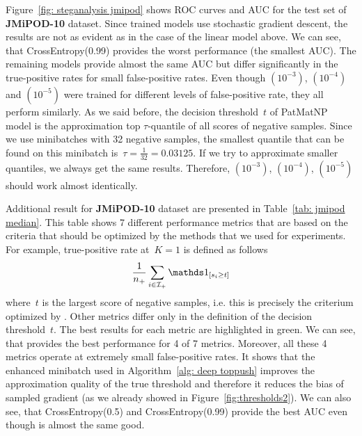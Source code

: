 Figure~\ref{fig: steganalysis jmipod} shows ROC curves and AUC for the test set of \textbf{JMiPOD-10} dataset. Since trained models use stochastic gradient descent, the results are not as evident as in the case of the linear model above. We can see, that CrossEntropy(0.99) provides the worst performance (the smallest AUC). The remaining models provide almost the same AUC but differ significantly in the true-positive rates for small false-positive rates. Even though \PatMatNP$\left(10^{-3}\right)$, \PatMatNP$\left(10^{-4}\right)$ and \PatMatNP$\left(10^{-5}\right)$ were trained for different levels of false-positive rate, they all perform similarly. As we said before, the decision threshold~$t$ of PatMatNP model is the approximation top $\tau$-quantile of all scores of negative samples. Since we use minibatches with 32 negative samples, the smallest quantile that can be found on this minibatch is~$\tau = \frac{1}{32}=0.03125.$ If we try to approximate smaller quantiles, we always get the same results. Therefore, \PatMatNP$\left(10^{-3}\right)$, \PatMatNP$\left(10^{-4}\right)$, \PatMatNP$\left(10^{-5}\right)$ should work almost identically.

Additional result for \textbf{JMiPOD-10} dataset are presented in Table~\ref{tab: jmipod median}. This table shows 7 different performance metrics that are based on the criteria that should be optimized by the methods that we used for experiments. For example, true-positive rate at~$K = 1$ is defined as follows
\begin{equation*}
  \frac{1}{\npos} \sum_{i \in \Ipos} \Iverson{s_i \geq t}
\end{equation*}
where~$t$ is the largest score of negative samples, i.e. this is precisely the criterium optimized by \DeepTopPush. Other metrics differ only in the definition of the decision threshold~$t$. The best results for each metric are highlighted in green. We can see, that \DeepTopPush provides the best performance for 4 of 7 metrics. Moreover, all these 4 metrics operate at extremely small false-positive rates. It shows that the enhanced minibatch used in \DeepTopPush Algorithm~\ref{alg: deep toppush} improves the approximation quality of the true threshold and therefore it reduces the bias of sampled gradient (as we already showed in Figure~\ref{fig:thresholds2}). We can also see, that CrossEntropy(0.5) and CrossEntropy(0.99) provide the best AUC even though \DeepTopPush is almost the same good.

